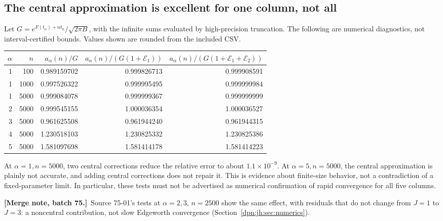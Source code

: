 \documentclass[11pt]{article}
\numberwithin{equation}{section}
\theoremstyle{definition}\newtheorem{definition}[theorem]{Definition}
\theoremstyle{remark}\newtheorem{remark}[theorem]{Remark}
\newcommand{\mergenoteb}[1]{\par\smallskip\noindent\textbf{[Merge note, batch 75.]}\ #1\par\smallskip}
\begin{document}
\subsection{The central approximation is excellent for one column, not all}
Let $G=e^{F(t_n)+nt_n}/\sqrt{2\pi B}$, with the infinite sums evaluated by
high-precision truncation. The following are numerical diagnostics, not
interval-certified bounds. Values shown are rounded from the included CSV.
\begin{center}
\begin{tabular}{rrrrr}
\toprule
$\alpha$ & $n$ & $a_\alpha(n)/G$ & $a_\alpha(n)/(G(1+\mathcal E_1))$
 & $a_\alpha(n)/(G(1+\mathcal E_1+\mathcal E_2))$\\
\midrule
1 & 100 & 0.989159702 & 0.999826713 & 0.999908591\\
1 & 1000 & 0.997526322 & 0.999995495 & 0.999999984\\
1 & 5000 & 0.999084078 & 0.999999367 & 0.999999999\\
2 & 5000 & 0.999545155 & 1.000036354 & 1.000036527\\
3 & 5000 & 0.961625508 & 0.961944240 & 0.961944315\\
4 & 5000 & 1.230518103 & 1.230825332 & 1.230825386\\
5 & 5000 & 1.581097698 & 1.581414178 & 1.581414223\\
\bottomrule
\end{tabular}
\end{center}
At $\alpha=1,n=5000$, two central corrections reduce the relative error to
about $1.1\times10^{-9}$. At $\alpha=5,n=5000$, the central approximation
is plainly not accurate, and adding central corrections does not repair it.
This is evidence about finite-size behavior, not a contradiction of a
fixed-parameter limit. In particular, these tests must not be advertised as
numerical confirmation of rapid convergence for all five columns.
\mergenoteb{Source 75-01's tests at $\alpha=2,3$, $n=2500$ show the same
effect, with residuals that do not change from $J=1$ to $J=3$: a noncentral
contribution, not slow Edgeworth convergence (Section~\ref{dpn:jh:sec:numerics}).}
\end{document}
